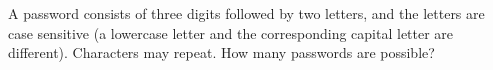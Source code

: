 A password consists of three digits followed by two letters, and the letters are case sensitive (a lowercase letter and the corresponding capital letter are different). Characters may repeat. How many passwords are possible?
